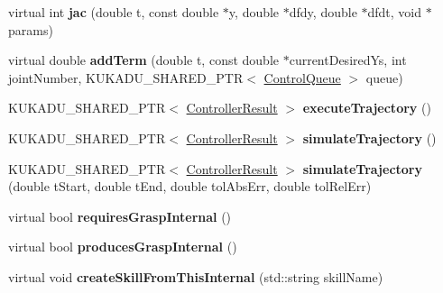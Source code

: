 \begin{DoxyCompactItemize}
\item 
virtual int {\bfseries jac} (double t, const double $\ast$y, double $\ast$dfdy, double $\ast$dfdt, void $\ast$params)\hypertarget{classkukadu_1_1DMPExecutor_a7653d938ffa32d0d6e3401e7db17a87e}{}\label{classkukadu_1_1DMPExecutor_a7653d938ffa32d0d6e3401e7db17a87e}

\item 
virtual double {\bfseries add\+Term} (double t, const double $\ast$current\+Desired\+Ys, int joint\+Number, K\+U\+K\+A\+D\+U\+\_\+\+S\+H\+A\+R\+E\+D\+\_\+\+P\+TR$<$ \hyperlink{classkukadu_1_1ControlQueue}{Control\+Queue} $>$ queue)\hypertarget{classkukadu_1_1DMPExecutor_a8dd322182fb9b37f9a6661865ad66251}{}\label{classkukadu_1_1DMPExecutor_a8dd322182fb9b37f9a6661865ad66251}

\item 
K\+U\+K\+A\+D\+U\+\_\+\+S\+H\+A\+R\+E\+D\+\_\+\+P\+TR$<$ \hyperlink{classkukadu_1_1ControllerResult}{Controller\+Result} $>$ {\bfseries execute\+Trajectory} ()\hypertarget{classkukadu_1_1DMPExecutor_a6f33217d4d3af41fbb58c2d2a394d397}{}\label{classkukadu_1_1DMPExecutor_a6f33217d4d3af41fbb58c2d2a394d397}

\item 
K\+U\+K\+A\+D\+U\+\_\+\+S\+H\+A\+R\+E\+D\+\_\+\+P\+TR$<$ \hyperlink{classkukadu_1_1ControllerResult}{Controller\+Result} $>$ {\bfseries simulate\+Trajectory} ()\hypertarget{classkukadu_1_1DMPExecutor_a7e0a8b15b047b3781e3185ceb9922e0e}{}\label{classkukadu_1_1DMPExecutor_a7e0a8b15b047b3781e3185ceb9922e0e}

\item 
K\+U\+K\+A\+D\+U\+\_\+\+S\+H\+A\+R\+E\+D\+\_\+\+P\+TR$<$ \hyperlink{classkukadu_1_1ControllerResult}{Controller\+Result} $>$ {\bfseries simulate\+Trajectory} (double t\+Start, double t\+End, double tol\+Abs\+Err, double tol\+Rel\+Err)\hypertarget{classkukadu_1_1DMPExecutor_a7c49950c3d809601a115bab006e8436f}{}\label{classkukadu_1_1DMPExecutor_a7c49950c3d809601a115bab006e8436f}

\item 
virtual bool {\bfseries requires\+Grasp\+Internal} ()\hypertarget{classkukadu_1_1DMPExecutor_ad746239693dced8f46c22ed2ff4c4fbb}{}\label{classkukadu_1_1DMPExecutor_ad746239693dced8f46c22ed2ff4c4fbb}

\item 
virtual bool {\bfseries produces\+Grasp\+Internal} ()\hypertarget{classkukadu_1_1DMPExecutor_aea0c8badad6417a3e4c98062107f2937}{}\label{classkukadu_1_1DMPExecutor_aea0c8badad6417a3e4c98062107f2937}

\item 
virtual void {\bfseries create\+Skill\+From\+This\+Internal} (std\+::string skill\+Name)\hypertarget{classkukadu_1_1DMPExecutor_ae1ef51477854c904b3170cccb73c8ae9}{}\label{classkukadu_1_1DMPExecutor_ae1ef51477854c904b3170cccb73c8ae9}

\end{DoxyCompactItemize}
